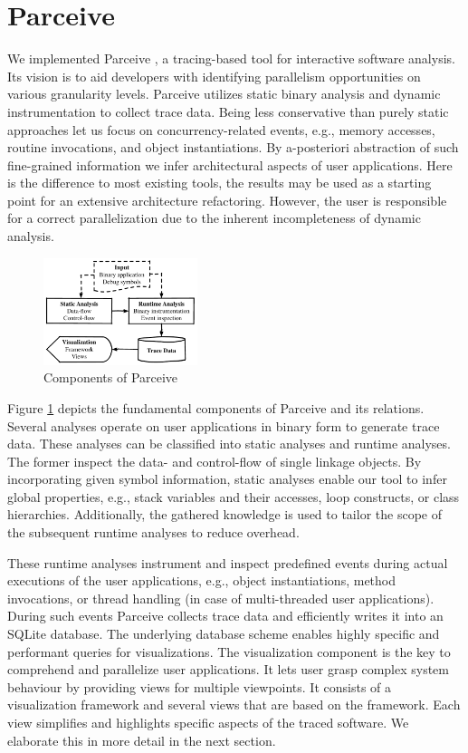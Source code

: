 \section{Parceive}
\label{sec:parceive}
We implemented Parceive \cite{Parceive}, a tracing-based tool for interactive software
analysis. Its vision is to aid developers with identifying parallelism
opportunities on various granularity levels. Parceive utilizes static binary
analysis and dynamic instrumentation to collect trace data. Being less
conservative than purely static approaches let us focus on concurrency-related
events, e.g., memory accesses, routine invocations, and object instantiations.
By a-posteriori abstraction of such fine-grained information we infer
architectural aspects of user applications. Here is the difference to most
existing tools, the results may be used as a starting point for an extensive
architecture refactoring. However, the user is responsible for a correct
parallelization due to the inherent incompleteness of dynamic analysis.

\begin{figure}[h!]
	\begin{center}
		\includegraphics[width=0.40\textwidth]{img/parceive}
		\caption{Components of Parceive}
		\label{fig:parceive_overview}
	\end{center}
\end{figure}

Figure \ref{fig:parceive_overview} depicts the fundamental components of
Parceive and its relations. Several analyses operate on user applications in
binary form to generate trace data. These analyses can be classified into
static analyses and runtime analyses. The former inspect the data- and
control-flow of single linkage objects. By incorporating given symbol
information, static analyses enable our tool to infer global properties, e.g.,
stack variables and their accesses, loop constructs, or class hierarchies.
Additionally, the gathered knowledge is used to tailor the scope of the
subsequent runtime analyses to reduce overhead.

These runtime analyses instrument and inspect predefined events during actual
executions of the user applications, e.g., object instantiations, method
invocations, or thread handling (in case of multi-threaded user applications).
During such events Parceive collects trace data and efficiently writes it into
an SQLite database. The underlying database scheme enables highly specific and
performant queries for visualizations. The visualization component is the key
to comprehend and parallelize user applications. It lets user grasp complex
system behaviour by providing views for multiple viewpoints. It consists of a
visualization framework and several views that are based on the framework. Each
view simplifies and highlights specific aspects of the traced software. We
elaborate this in more detail in the next section.